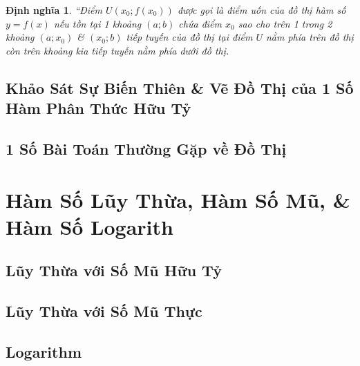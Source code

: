 \documentclass[oneside]{book}
\numberwithin{equation}{section}
\newtheorem{dinhnghia}{Định nghĩa}[section]
\begin{document}
\begin{dinhnghia}
	``Điểm $U(x_0;f(x_0))$ được gọi là \emph{điểm uốn} của đồ thị hàm số $y = f(x)$ nếu tồn tại 1 khoảng $(a;b)$ chứa điểm $x_0$ sao cho trên 1 trong 2 khoảng $(a;x_0)$ \& $(x_0;b)$ tiếp tuyến của đồ thị tại điểm $U$ nằm phía trên đồ thị còn trên khoảng kia tiếp tuyến nằm phía dưới đồ thị.
\end{dinhnghia}


\section{Khảo Sát Sự Biến Thiên \& Vẽ Đồ Thị của 1 Số Hàm Phân Thức Hữu Tỷ}


\section{1 Số Bài Toán Thường Gặp về Đồ Thị}


\chapter{Hàm Số Lũy Thừa, Hàm Số Mũ, \& Hàm Số Logarith}

\section{Lũy Thừa với Số Mũ Hữu Tỷ}


\section{Lũy Thừa với Số Mũ Thực}


\section{Logarithm}

\end{document}
